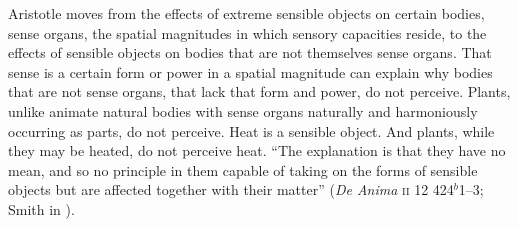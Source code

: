 Aristotle moves from the effects of extreme sensible objects on certain bodies, sense organs, the spatial magnitudes in which sensory capacities reside, to the effects of sensible objects on bodies that are not themselves sense organs. That sense is a certain form or power in a spatial magnitude can explain why bodies that are not sense organs, that lack that form and power, do not perceive. Plants, unlike animate natural bodies with sense organs naturally and harmoniously occurring as parts, do not perceive. Heat is a sensible object. And plants, while they may be heated, do not perceive heat. ``The explanation is that they have no mean, and so no principle in them capable of taking on the forms of sensible objects but are affected together with their matter'' (\emph{De Anima} \textsc{ii} 12 424\( ^{b} \)1--3; Smith in \citealt[43]{Barnes:1984uq}). 

